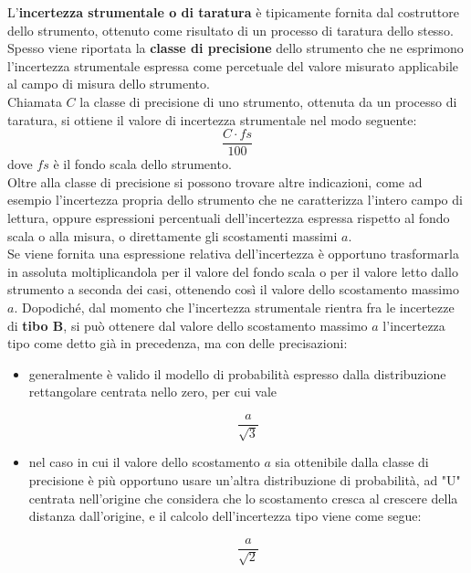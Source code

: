 \documentclass[a4paper, twoside]{article}
\begin{document}
L'\textbf{incertezza strumentale o di taratura} è tipicamente fornita dal costruttore dello strumento, ottenuto come risultato di un processo di taratura dello stesso. Spesso viene riportata la \textbf{classe di precisione} dello strumento che ne esprimono l'incertezza strumentale espressa come percetuale del valore misurato applicabile al campo di misura dello strumento.\\
Chiamata $C$ la classe di precisione di uno strumento, ottenuta da un processo di taratura, si ottiene il valore di incertezza strumentale nel modo seguente:
\begin{equation}
    \frac{C \cdot fs}{100}
\end{equation}
dove $fs$ è il fondo scala dello strumento.\\
Oltre alla classe di precisione si possono trovare altre indicazioni, come ad esempio l'incertezza propria dello strumento che ne caratterizza l'intero campo di lettura, oppure espressioni percentuali dell'incertezza espressa rispetto al fondo scala o alla misura, o direttamente gli scostamenti massimi $a$.\\
Se viene fornita una espressione relativa dell'incertezza è opportuno trasformarla in assoluta moltiplicandola per il valore del fondo scala o per il valore letto dallo strumento a seconda dei casi, ottenendo così il valore dello scostamento massimo $a$. Dopodiché, dal momento che l'incertezza strumentale rientra fra le incertezze di \textbf{tibo B}, si può ottenere dal valore dello scostamento massimo $a$ l'incertezza tipo come detto già in precedenza, ma con delle precisazioni:

\begin{itemize}
    \item generalmente è valido il modello di probabilità espresso dalla distribuzione rettangolare centrata nello zero, per cui vale
    
        \begin{equation}
            \frac{a}{\sqrt{3}}
        \end{equation}
    
    \item nel caso in cui il valore dello scostamento $a$ sia ottenibile dalla classe di precisione è più opportuno usare un'altra distribuzione di probabilità, ad "U" centrata nell'origine che considera che lo scostamento cresca al crescere della distanza dall'origine, e il calcolo dell'incertezza tipo viene come segue:
    
        \begin{equation}
            \frac{a}{\sqrt{2}}
        \end{equation}

\end{itemize}
\end{document}

